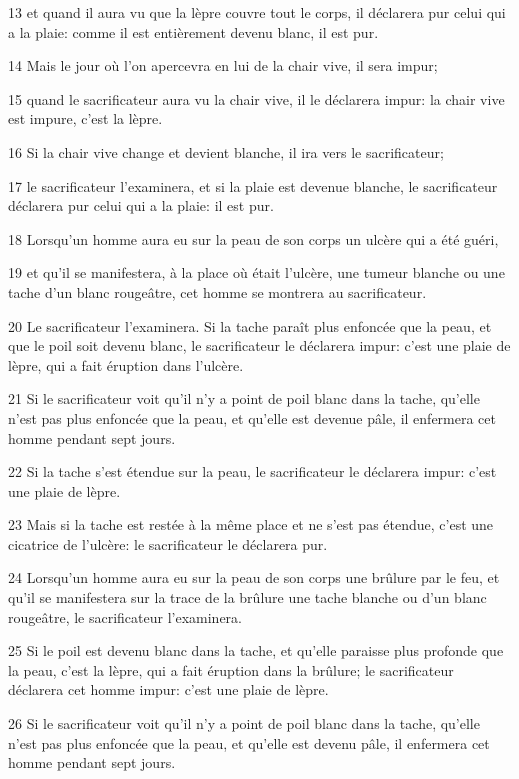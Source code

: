 \par 13 et quand il aura vu que la lèpre couvre tout le corps, il déclarera pur celui qui a la plaie: comme il est entièrement devenu blanc, il est pur.
\par 14 Mais le jour où l'on apercevra en lui de la chair vive, il sera impur;
\par 15 quand le sacrificateur aura vu la chair vive, il le déclarera impur: la chair vive est impure, c'est la lèpre.
\par 16 Si la chair vive change et devient blanche, il ira vers le sacrificateur;
\par 17 le sacrificateur l'examinera, et si la plaie est devenue blanche, le sacrificateur déclarera pur celui qui a la plaie: il est pur.
\par 18 Lorsqu'un homme aura eu sur la peau de son corps un ulcère qui a été guéri,
\par 19 et qu'il se manifestera, à la place où était l'ulcère, une tumeur blanche ou une tache d'un blanc rougeâtre, cet homme se montrera au sacrificateur.
\par 20 Le sacrificateur l'examinera. Si la tache paraît plus enfoncée que la peau, et que le poil soit devenu blanc, le sacrificateur le déclarera impur: c'est une plaie de lèpre, qui a fait éruption dans l'ulcère.
\par 21 Si le sacrificateur voit qu'il n'y a point de poil blanc dans la tache, qu'elle n'est pas plus enfoncée que la peau, et qu'elle est devenue pâle, il enfermera cet homme pendant sept jours.
\par 22 Si la tache s'est étendue sur la peau, le sacrificateur le déclarera impur: c'est une plaie de lèpre.
\par 23 Mais si la tache est restée à la même place et ne s'est pas étendue, c'est une cicatrice de l'ulcère: le sacrificateur le déclarera pur.
\par 24 Lorsqu'un homme aura eu sur la peau de son corps une brûlure par le feu, et qu'il se manifestera sur la trace de la brûlure une tache blanche ou d'un blanc rougeâtre, le sacrificateur l'examinera.
\par 25 Si le poil est devenu blanc dans la tache, et qu'elle paraisse plus profonde que la peau, c'est la lèpre, qui a fait éruption dans la brûlure; le sacrificateur déclarera cet homme impur: c'est une plaie de lèpre.
\par 26 Si le sacrificateur voit qu'il n'y a point de poil blanc dans la tache, qu'elle n'est pas plus enfoncée que la peau, et qu'elle est devenu pâle, il enfermera cet homme pendant sept jours.
